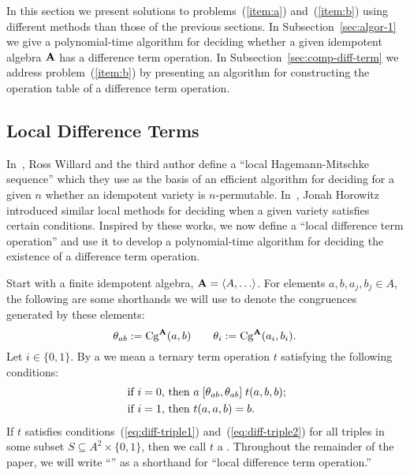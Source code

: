 \documentclass{ws-ijac}
\begin{document}

\medskip

In this section we present solutions to problems~(\ref{item:a}) and~(\ref{item:b})
using different methods than those of the previous sections.
In Subsection~\ref{sec:algor-1} we give a polynomial-time algorithm
for deciding whether a given idempotent algebra $\mathbf{A}$ has a difference term operation.
In Subsection~\ref{sec:comp-diff-term} we address problem~(\ref{item:b})
by presenting an algorithm for constructing  the operation table of a difference term operation.

\subsection{Local Difference Terms}
\label{sec:local-diff-terms}
In~\cite{MR3239624},
Ross Willard and the third author define %
a ``local Hagemann-Mitschke sequence'' which they use as the basis of
an efficient algorithm for deciding for a given $n$ whether an idempotent
variety is $n$-permutable.
In~\cite{MR3109457}, Jonah Horowitz introduced similar
local methods for deciding when a given variety satisfies
certain \malcev conditions.
Inspired by these works, we now define a ``local difference term
operation'' and use it to develop a polynomial-time algorithm for deciding
the existence of a difference term operation.

Start with a finite idempotent algebra, $\alg A =\< A, \dots\>$.
For elements $a, b, a_j, b_j \in A$, the following are some shorthands
we will use to denote the congruences generated by these elements:
\[
\theta_{ab}:= \operatorname{Cg}^{\mathbf{A}}(a, b) \qquad
\theta_{i}:= \operatorname{Cg}^{\mathbf{A}}(a_i, b_i).
\]
Let $i \in \{0,1\}$.
By a 
we mean a ternary term operation $t$ satisfying the following conditions:
\begin{align}
\text{ if $i=0$, then } & a \comr{\thetaab} t(a,b,b); \label{eq:diff-triple1}\\
\text{ if $i=1$, then } & t(a,a,b) = b. \label{eq:diff-triple2}
\end{align}
If $t$ satisfies conditions~(\ref{eq:diff-triple1}) and~(\ref{eq:diff-triple2})
for all triples in some subset $S\subseteq A^2 \times \{0,1\}$, then we call $t$
a .
Throughout the remainder of the paper, we will
write ``\ldto'' as a shorthand for
``local difference term operation.''
\end{document}
